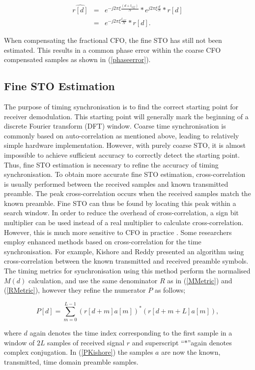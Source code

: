 \begin{eqnarray}
\label{phaseerror}
\widehat{r[d]} &=&  e^{-j2\pi\xi \frac{(d+t_{off})}{N}}*e^{j2\pi\xi \frac{d}{N}}*r[d] \nonumber \\
&=& e^{-j2\pi\xi \frac{t_{off}}{N}}*r[d].
\end{eqnarray}

When compensating the fractional CFO, the fine STO has still not been estimated. This results in a common phase error within the coarse CFO compensated samples as shown in (\ref{phaseerror}).

\subsection{Fine STO Estimation}

The purpose of timing synchronisation is to find the correct starting point for receiver demodulation.
This starting point will generally mark the beginning of a discrete Fourier transform (DFT) window. 
Coarse time synchronisation is commonly based on auto-correlation as mentioned above, leading to relatively simple hardware implementation. 
However, with purely coarse STO, it is almost impossible to achieve sufficient accuracy to correctly detect the starting point.
Thus,  fine STO estimation is necessary to refine the accuracy of timing synchronisation. 
To obtain more accurate fine STO estimation, cross-correlation is usually performed between the received samples and known transmitted preamble. 
The peak cross-correlation occurs when the received samples match the known preamble. 
Fine STO can thus be found by locating this peak within a search window. 
In order to reduce the overhead of cross-correlation, a sign bit multiplier can be used instead of a real multiplier to calculate cross-correlation. However, this is much more sensitive to CFO in practice \cite{Schwoerer2002}. Some researchers employ enhanced methods based on cross-correlation for the time synchronisation. 
For example, Kishore and Reddy \cite{Kishore2006} presented an algorithm using cross-correlation between the known transmitted and received preamble symbols. 
The timing metrics for synchronisation using this method perform the normalised $M(d)$ calculation, and use the same denominator $R$ as in (\ref{MMetric}) and (\ref{RMetric}), however they refine the numerator $P$ as follows;
\begin{center}
\begin{equation}
\label{PKishore}
P[d] =\sum_{m =0}^{L-1}    (r[d+m] a[m])^{*} (r[d+m+L] a[m]),
\end{equation}
\end{center} 
where $d$ again denotes the time index corresponding to the first sample in a window of $2L$ samples of received signal $r$ and superscript \textquotedblleft$*$\textquotedblright again denotes complex conjugation. In (\ref{PKishore}) the samples $a$ are now the known, transmitted, time domain preamble samples.

